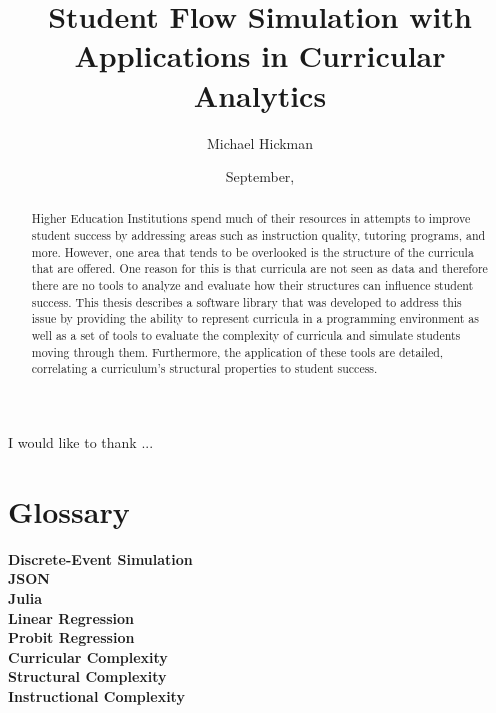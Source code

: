 \documentclass[botnum, fleqn]{unmeethesis}
\begin{document}
\frontmatter

\title{Student Flow Simulation with Applications in Curricular Analytics}
\author{Michael Hickman}
\date{September, \thisyear}

\maketitle
\makecopyright




\begin{acknowledgments}
  \vspace{1.1in}
  I would like to thank ...
\end{acknowledgments}


\maketitleabstract

\begin{abstract}
  Higher Education Institutions spend much of their resources in attempts to improve student success by addressing areas such as instruction quality, tutoring programs, and more. However, one area that tends to be overlooked is the structure of the curricula that are offered. One reason for this is that curricula are not seen as data and therefore there are no tools to analyze and evaluate how their structures can influence student success. This thesis describes a software library that was developed to address this issue by providing the ability to represent curricula in a programming environment as well as a set of tools to evaluate the complexity of curricula and simulate students moving through them. Furthermore, the application of these tools are detailed, correlating a curriculum's structural properties to student success.
  \clearpage
\end{abstract}


\tableofcontents
\listoffigures


\chapter{Glossary}
  \textbf{Discrete-Event Simulation} \  \\
  \textbf{JSON} \  \\
  \textbf{Julia} \  \\
  \textbf{Linear Regression} \  \\
  \textbf{Probit Regression} \  \\
  \textbf{Curricular Complexity} \  \\
  \textbf{Structural Complexity} \  \\
  \textbf{Instructional Complexity} \  \\
\end{document}
